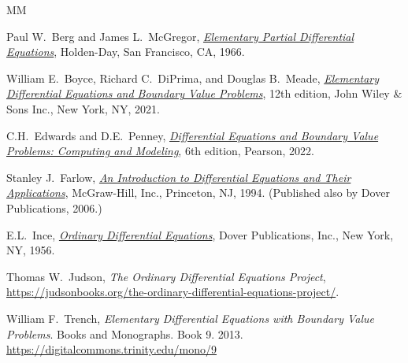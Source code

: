 \documentclass[12pt]{book}
\begin{document}


\renewcommand{\bibname}{Further Reading}

\begin{thebibliography}{MM}


\label{furtherreading:chapter}

 Paul W.\ Berg and James L.\ McGregor, 
 \emph{\href{https://books.google.com/books?id=EfJQAAAAMAAJ}{Elementary
Partial Differential Equations}}, 
 Holden-Day,
 San Francisco, CA\@,
 1966.

 William E.\ Boyce, 
 Richard C.\ DiPrima,
 and Douglas B.\ Meade,
 \emph{\href{https://books.google.com/books?id=DX9zEAAAQBAJ}{Elementary
Differential Equations and Boundary Value Problems}},
 12th edition,
 John Wiley \& Sons Inc.,
 New York, NY\@, 2021.

 C.H.\ Edwards and D.E.\ Penney,
 \emph{\href{https://books.google.com/books?id=GrNszwEACAAJ}{Differential
Equations and Boundary Value Problems: Computing and Modeling}},
 6th edition,
 Pearson,
 2022.

 Stanley J.\ Farlow,
 \emph{\href{https://books.google.com/books?id=_ozWAAAAMAAJ}{An Introduction
to Differential Equations and Their Applications}},
 McGraw-Hill, Inc.,
 Princeton, NJ\@,
 1994.  (Published also by Dover Publications, 2006.)

 E.L.\ Ince,
 \emph{\href{https://books.google.com/books?id=uYz-pqUD75gC}{Ordinary
Differential Equations}},
 Dover Publications, Inc.,
 New York, NY\@,
 1956.

  Thomas W.\ Judson,
  \emph{The Ordinary Differential Equations Project},
  \url{https://judsonbooks.org/the-ordinary-differential-equations-project/}.

 William F.\ Trench,
 \emph{Elementary Differential Equations with Boundary Value
Problems}. Books and Monographs. Book 9.  2013.
\url{https://digitalcommons.trinity.edu/mono/9}

\end{thebibliography}
\end{document}
